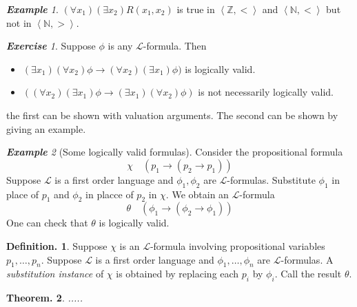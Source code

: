 \documentclass[a4paper,oneside,11pt,DIV=12,parskip=half]{scrartcl}
\newcommand{\N}{\mathbb N}
\newcommand{\LL}{\mathcal L}
\newcommand{\skal}[1]{\left \langle #1 \right\rangle}
\theoremstyle{plain}
\newtheorem{theorem}{Theorem.}[section]
\theoremstyle{definition}
\newtheorem{definition}[theorem]{Definition.}
\newtheorem{remark, definition}[theorem]{Remark and Definition.}
\newtheorem{lemma, definition}[theorem]{Lemma and Definition.}
\newtheorem{theorem, definition}[theorem]{Theorem and Definition.}
\theoremstyle{remark}
\newtheorem*{exercise}{\textbf{Exercise}}
\newtheorem*{example}{\textbf{Example}}
\newtheorem*{remark, example}{\textbf{Remark and Exercise}}
\begin{document}
\begin{example}
    $(\forall x_1)(\exists x_2) R(x_1,x_2)$ is true in $\skal{\mathbb{Z},<}$ and $\skal{\N,<}$ but not in $\skal{\N,>}$.
\end{example}

\begin{exercise}
    Suppose $\phi$ is any $\LL$-formula. Then
    \begin{itemize}
        \item $(\exists x_1)(\forall x_2) \phi \rightarrow (\forall x_2)(\exists x_1)\phi) $ is logically valid.
        \item $((\forall x_2)(\exists x_1) \phi \rightarrow (\exists x_1)(\forall x_2)\phi)$ is not necessarily logically valid.
    \end{itemize}
    the first can be shown with valuation arguments. The second can be shown by giving an example.
\end{exercise}

\begin{example}[Some logically valid formulas]
Consider the propositional formula 
    \[ \chi \quad (p_1 \rightarrow (p_2 \rightarrow p_1)) \]
    Suppose $\LL$ is a first order language and $\phi_1, \phi_2$ are $\LL$-formulas. Substitute $\phi_1$ in place of $p_1$ and $\phi_2$ in placce of $p_2$ in $\chi$. We obtain an $\LL$-formula 
    \[ \theta \quad (\phi_1 \rightarrow (\phi_2 \rightarrow \phi_1)) \]
    One can check that $\theta$ is logically valid.
    
\end{example}

\begin{definition}
 Suppose $\chi$ is an $\LL$-formula involving propositional variables $p_1,\dots ,p_n$. Suppose $\LL$ is a first order language and $\phi_1,\dots,\phi_n$ are $\LL$-formulas. A \emph{substitution instance} of $\chi$ is obtained by replacing each $p_i$ by $\phi_i$. Call the result $\theta$.   
\end{definition}

\begin{theorem}
.....
\end{theorem}
\end{document}
